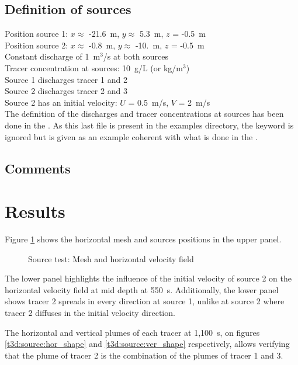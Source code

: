 \subsection{Definition of sources}
%
Position source 1: $x \approx$ -21.6~m, $y \approx$ 5.3~m, $z$ = -0.5~m\\
Position source 2: $x \approx$ -0.8~m, $y \approx$ -10.~m, $z$ = -0.5~m\\
Constant discharge of 1~m$^3$/s at both sources\\
Tracer concentration at sources: 10~g/L (or kg/m$^3$)\\
Source 1 discharges tracer 1 and 2\\
Source 2 discharges tracer 2 and 3\\
Source 2 has an initial velocity: $U$ = 0.5~m/s, $V$ = 2~m/s\\
%
The definition of the discharges and tracer concentrations at sources
has been done in the .
As this last file is present in the examples directory, the keyword
 is ignored but is given
as an example coherent with what is done in the .
%
\subsection{Comments}
%
%
%
\section{Results}
%
Figure \ref{t3d:source:mesh_vel} shows the horizontal mesh and sources
positions in the upper panel.

\begin{figure} [H]
\centering
{}
 \caption{Source test: Mesh and horizontal velocity field}
 \label{t3d:source:mesh_vel}
\end{figure}

The lower panel highlights the influence of the initial velocity of
source 2 on the horizontal velocity field at mid depth at 550~s.
Additionally, the lower panel shows tracer 2 spreads in every direction
at source 1, unlike at source 2 where tracer 2 diffuses in the initial
velocity direction.

The horizontal and vertical plumes of each tracer at 1,100~s, on
figures \ref{t3d:source:hor_shape} and \ref{t3d:source:ver_shape}
respectively, allows verifying that the plume of tracer 2 is the
combination of the plumes of tracer 1 and 3.

